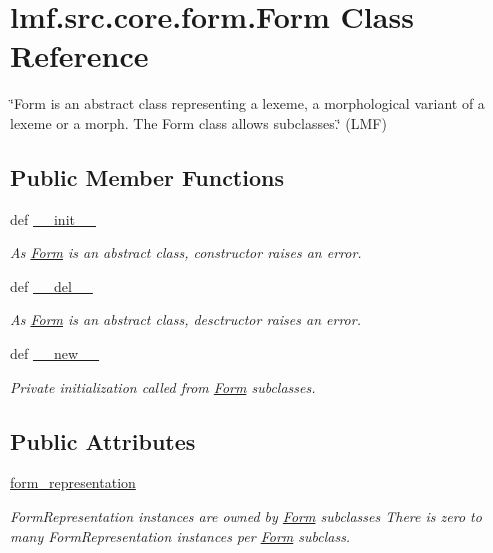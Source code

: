 \hypertarget{classlmf_1_1src_1_1core_1_1form_1_1_form}{\section{lmf.\+src.\+core.\+form.\+Form Class Reference}
\label{classlmf_1_1src_1_1core_1_1form_1_1_form}
}


\char`\"{}\+Form is an abstract class representing a lexeme, a morphological variant of a lexeme or a morph. The Form class allows subclasses.\char`\"{} (L\+M\+F)  


\subsection*{Public Member Functions}
\begin{DoxyCompactItemize}
\item 
def \hyperlink{classlmf_1_1src_1_1core_1_1form_1_1_form_a5d8193e2ae85d0844470137d14504ae1}{\+\_\+\+\_\+init\+\_\+\+\_\+}
\begin{DoxyCompactList}\small\item\em As \hyperlink{classlmf_1_1src_1_1core_1_1form_1_1_form}{Form} is an abstract class, constructor raises an error. \end{DoxyCompactList}\item 
def \hyperlink{classlmf_1_1src_1_1core_1_1form_1_1_form_a4efc5b5afe396103742f2be36f3ada35}{\+\_\+\+\_\+del\+\_\+\+\_\+}
\begin{DoxyCompactList}\small\item\em As \hyperlink{classlmf_1_1src_1_1core_1_1form_1_1_form}{Form} is an abstract class, desctructor raises an error. \end{DoxyCompactList}\item 
def \hyperlink{classlmf_1_1src_1_1core_1_1form_1_1_form_a6b5179aebc5f1a51875d3cc5301c6f84}{\+\_\+\+\_\+new\+\_\+\+\_\+}
\begin{DoxyCompactList}\small\item\em Private initialization called from \hyperlink{classlmf_1_1src_1_1core_1_1form_1_1_form}{Form} subclasses. \end{DoxyCompactList}\end{DoxyCompactItemize}
\subsection*{Public Attributes}
\begin{DoxyCompactItemize}
\item 
\hyperlink{classlmf_1_1src_1_1core_1_1form_1_1_form_a81a147d40e70054d06b4ad90fd523a8f}{form\+\_\+representation}
\begin{DoxyCompactList}\small\item\em Form\+Representation instances are owned by \hyperlink{classlmf_1_1src_1_1core_1_1form_1_1_form}{Form} subclasses There is zero to many Form\+Representation instances per \hyperlink{classlmf_1_1src_1_1core_1_1form_1_1_form}{Form} subclass. \end{DoxyCompactList}\end{DoxyCompactItemize}


